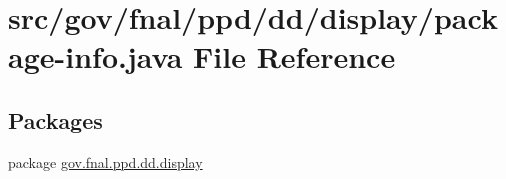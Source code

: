 \hypertarget{gov_2fnal_2ppd_2dd_2display_2package-info_8java}{\section{src/gov/fnal/ppd/dd/display/package-\/info.java File Reference}
\label{gov_2fnal_2ppd_2dd_2display_2package-info_8java}
}
\subsection*{Packages}
\begin{DoxyCompactItemize}
\item 
package \hyperlink{namespacegov_1_1fnal_1_1ppd_1_1dd_1_1display}{gov.\-fnal.\-ppd.\-dd.\-display}
\end{DoxyCompactItemize}
